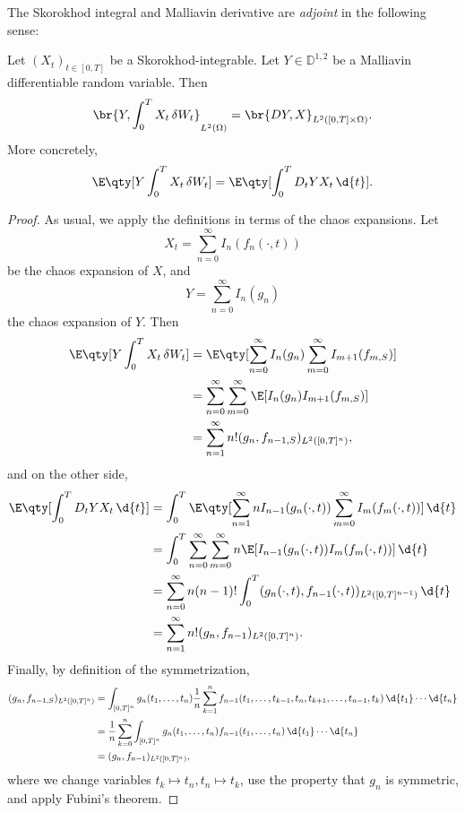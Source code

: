 \documentclass[
    a4paper,
    DIV=14,
    abstract=true,
    numbers=noenddot
]{scrartcl}
\begin{document}
\begin{theorem}
	The Skorokhod integral and Malliavin derivative are \emph{adjoint} in the
	following sense:

	Let $(X_t)_{t \in [0, T]}$ be a Skorokhod-integrable. Let $Y \in \mathbb{D}^{1,
			2}$ be a Malliavin differentiable random variable. Then
	\[
		\br{
			Y, \int_0^T X_t \, \delta{W}_t
		}_{L^2(\Omega)}
		= \br{
			D{Y}, X
		}_{L^2([0,T]\times\Omega)}.
	\]
	More concretely,
	\[
		\E\qty[
			Y \int_0^T X_t \, \delta{W}_t
		]
		= \E\qty[
			\int_0^T
			D_t Y X_t
			\, \d{t}
		].
	\]
\end{theorem}
\begin{proof}
	As usual, we apply the definitions in terms of the chaos expansions. Let
	\[
		X_t = \sum_{n = 0}^\infty I_n(f_n(\cdot, t))
	\]
	be the chaos expansion of $X$, and
	\[
		Y = \sum_{n = 0}^\infty I_n(g_n)
	\]
	the chaos expansion of $Y$. Then
	\begin{align*}
		\E\qty[
			Y \int_0^T X_t \, \delta{W}_t
		]
		 & = \E\qty[
			\sum_{n = 0}^\infty I_n(g_n)
			\sum_{m = 0}^\infty I_{m + 1}({f}_{m,S})
		]                                                                 \\
		 & = \sum_{n = 0}^\infty \sum_{m = 0}^\infty
		\E[I_n(g_n) I_{m + 1}({f}_{m,S})]                               \\
		 & = \sum_{n = 1}^\infty n! (g_n, {f}_{n - 1,S})_{L^2([0, T]^n)},
	\end{align*}
	and on the other side,
	\begin{align*}
		\E\qty[
		\int_0^T D_t{Y} X_t \, \d{t}
		]
		 & = \int_0^T \E\qty[
			\sum_{n = 1}^\infty n I_{n - 1}(g_n(\cdot, t))
			\sum_{m = 0}^\infty I_m(f_m(\cdot, t))
		] \, \d{t}                                            \\
		 & = \int_0^T \sum_{n = 0}^\infty \sum_{m = 0}^\infty
		n \E[
			I_{n - 1}(g_n(\cdot, t)) I_m(f_m(\cdot, t))
		 ] \, \d{t}                                            \\
		 & = \sum_{n = 0}^\infty
		n (n - 1)! \int_0^T
		(g_n(\cdot, t), f_{n - 1}(\cdot, t))_{L^2([0, T]^{n - 1})}
		\, \d{t}                                              \\
		 & = \sum_{n = 1}^\infty
		n! (g_n, f_{n - 1})_{L^2([0, T]^n)}.
	\end{align*}
	Finally, by definition of the symmetrization,
	\begin{align*}
		(g_n, f_{n - 1,S})_{L^2([0, T]^n)}
		 & = \int_{[0, T]^n}
		g_n(t_1, \dots, t_n)
		\frac{1}{n} \sum_{k = 1}^n
		f_{n-1}(t_1, \dots, t_{k - 1}, t_n, t_{k + 1}, \dots, t_{n - 1}, t_k)
		\, \d{t_1} \cdots \d{t_n}                       \\
		 & = \frac{1}{n} \sum_{k = 0}^n \int_{[0, T]^n}
		g_n(t_1, \dots, t_n)
		f_{n - 1}(t_1, \dots, t_n)
		\, \d{t_1} \cdots \d{t_n}                       \\
		 & = (g_n, f_{n - 1})_{L^2([0, T]^n)},
	\end{align*}
	where we change variables $t_k \mapsto t_n, t_n \mapsto t_k$, use the
	property that $g_n$ is symmetric, and apply Fubini's theorem.
\end{proof}
\end{document}
